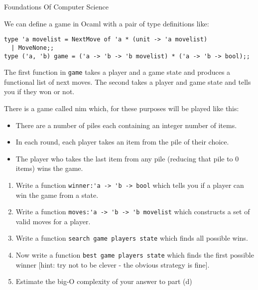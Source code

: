 \documentclass{tripos}
\begin{document}
\begin{question}[MockIA,year=2025,paper=1,question=1,author=nobody]{Foundations Of Computer Science}

We can define a game in Ocaml with a pair of type definitions like:

\begin{verbatim}
type 'a movelist = NextMove of 'a * (unit -> 'a movelist)
  | MoveNone;;
type ('a, 'b) game = ('a -> 'b -> 'b movelist) * ('a -> 'b -> bool);;
\end{verbatim}

The first function in \verb|game| takes a player and a game state and produces a functional list of next moves.
The second takes a player and game state and tells you if they won or not.

There is a game called nim which, for these purposes will be played like this:

\begin{itemize}
\item There are a number of piles each containing an integer number of items.
\item In each round, each player takes an item from the pile of their choice.
\item The player who takes the last item from any pile (reducing that pile to 0 items) wins the game.
\end{itemize}

\begin{enumerate}
\item Write a function \verb|winner:'a -> 'b -> bool| which tells you if a player can win the game from a state. 
\item Write a function \verb|moves:'a -> 'b -> 'b movelist| which constructs a set of valid moves for a player. 
\item Write a function \verb|search game players state| which finds all possible wins. 
\item Now write a function \verb|best game players state| which finds the first possible winner [hint: try not to be clever - the obvious strategy is fine]. 
\item Estimate the big-O complexity of your answer to part (d) 
\end{enumerate}

\eject
\end{question}
\end{document}
